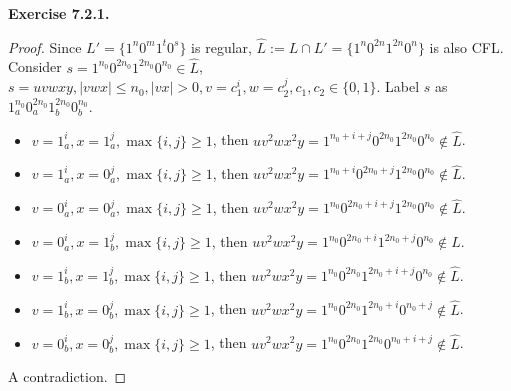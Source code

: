 \documentclass[a4paper]{article}
\newtheorem*{proof}{Proof}
\newenvironment{exercise}[1]{
	\par
	\noindent\textbf{Exercise #1.}\quad
}{
	\par
	\bigskip
}
\begin{document}
\begin{exercise}{7.2.1}
\begin{proof}
        Since $L'=\{1^n0^m1^t0^s\}$ is regular, $\hat{L}:=L\cap L'=\{1^n0^{2n}1^{2n}0^n\}$ is also CFL.
        Consider $s=1^{n_0}0^{2n_0}1^{2n_0}0^{n_0}\in \hat{L}$, $s=uvwxy,|vwx|\leqslant n_0,|vx|>0,v=c_1^i,
        w=c_2^j,c_1,c_2\in\{0,1\}$.
        Label $s$ as $1_a^{n_0}0_a^{2n_0}1_b^{2n_0}0_b^{n_0}$.
        \begin{itemize}
            \item $v=1_a^i,x=1_a^j,\max\{i,j\}\geqslant 1$, then $uv^2wx^2y=1^{n_0+i+j}0^{2n_0}1^{2n_0}0^{n_0}\notin \hat{L}$.
            \item $v=1_a^i,x=0_a^j,\max\{i,j\}\geqslant 1$, then $uv^2wx^2y=1^{n_0+i}0^{2n_0+j}1^{2n_0}0^{n_0}\notin \hat{L}$.
            \item $v=0_a^i,x=0_a^j,\max\{i,j\}\geqslant 1$, then $uv^2wx^2y=1^{n_0}0^{2n_0+i+j}1^{2n_0}0^{n_0}\notin \hat{L}$.
            \item $v=0_a^i,x=1_b^j,\max\{i,j\}\geqslant 1$, then $uv^2wx^2y=1^{n_0}0^{2n_0+i}1^{2n_0+j}0^{n_0}\notin \hat{L}$.
            \item $v=1_b^i,x=1_b^j,\max\{i,j\}\geqslant 1$, then $uv^2wx^2y=1^{n_0}0^{2n_0}1^{2n_0+i+j}0^{n_0}\notin \hat{L}$.
            \item $v=1_b^i,x=0_b^j,\max\{i,j\}\geqslant 1$, then $uv^2wx^2y=1^{n_0}0^{2n_0}1^{2n_0+i}0^{n_0+j}\notin \hat{L}$.
            \item $v=0_b^i,x=0_b^j,\max\{i,j\}\geqslant 1$, then $uv^2wx^2y=1^{n_0}0^{2n_0}1^{2n_0}0^{n_0+i+j}\notin \hat{L}$.
        \end{itemize}
        A contradiction.
    \end{proof}
\end{exercise}
\end{document}
